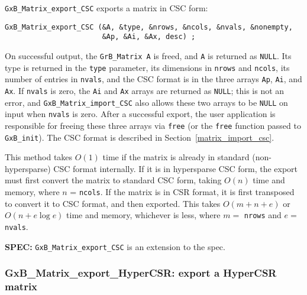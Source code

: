 \documentclass[12pt]{article}
\begin{document}
\verb'GxB_Matrix_export_CSC' exports a matrix in CSC form:

{\footnotesize
\begin{verbatim}
GxB_Matrix_export_CSC (&A, &type, &nrows, &ncols, &nvals, &nonempty,
                       &Ap, &Ai, &Ax, desc) ;
\end{verbatim}}

On successful output, the \verb'GrB_Matrix A' is freed, and \verb'A' is
returned as \verb'NULL'.  Its type is returned in the \verb'type' parameter,
its dimensions in \verb'nrows' and \verb'ncols', its number of entries in
\verb'nvals', and the CSC format is in the three arrays \verb'Ap', \verb'Ai',
and \verb'Ax'.  If \verb'nvals' is zero, the \verb'Ai' and \verb'Ax' arrays are
returned as \verb'NULL'; this is not an error, and \verb'GxB_Matrix_import_CSC'
also allows these two arrays to be \verb'NULL' on input when \verb'nvals' is
zero.  After a successful export, the user application is responsible for
freeing these three arrays via \verb'free' (or the \verb'free' function passed to \verb'GxB_init').  The CSC format is
described in Section~\ref{matrix_import_csc}.

This method takes $O(1)$ time if the matrix is already in standard
(non-hypersparse) CSC format internally.  If it is in hypersparse CSC form, the
export must first convert the matrix to standard CSC form, taking $O(n)$ time
and memory, where $n$ = \verb'ncols'.  If the matrix is in CSR
format, it is first transposed to convert it to CSC format, and then exported.
This takes $O(m+n+e)$ or $O(n+e \log e)$ time and memory, whichever is less,
where $m=$ \verb'nrows' and $e=$ \verb'nvals'.

\begin{spec}
{\bf SPEC:} \verb'GxB_Matrix_export_CSC' is an extension to the spec.
\end{spec}

\newpage
\subsubsection{{\sf GxB\_Matrix\_export\_HyperCSR:} export a HyperCSR matrix}
\label{matrix_export_hypercsr}
\end{document}
